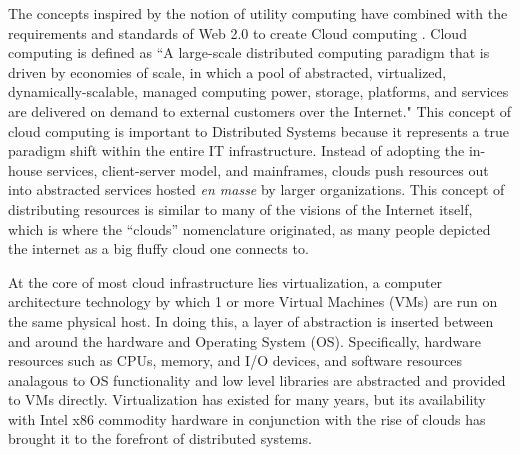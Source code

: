 The concepts inspired by the notion of utility computing have combined with the requirements and standards of Web 2.0 \cite{alexander2006wnw} to create Cloud computing \cite{buyya2008moc, foster2008cca, aboveTheClouds}.  Cloud computing is defined as ``A large-scale distributed computing paradigm that is driven by economies of scale, in which a pool of abstracted, virtualized, dynamically-scalable, managed computing power, storage, platforms, and services are delivered on demand to external customers over the Internet." This concept of cloud computing is important to Distributed Systems because it represents a true paradigm shift \cite{kuhn1970structure} within the entire IT infrastructure.  Instead of adopting the in-house services, client-server model, and mainframes, clouds push resources out into abstracted services hosted \textit{en masse} by larger organizations.  This concept of distributing resources is similar to many of the visions of the Internet itself, which is where the ``clouds'' nomenclature originated, as many people depicted the internet as a big fluffy cloud one connects to.

At the core of most cloud infrastructure lies virtualization, a computer architecture technology by which 1 or more Virtual Machines (VMs) are run on the same physical host. In doing this, a layer of abstraction is inserted between and around the hardware and Operating System (OS). Specifically, hardware resources such as CPUs, memory, and I/O devices, and software resources analagous to OS functionality and low level libraries are abstracted and provided to VMs directly. Virtualization has existed for many years, but its availability with Intel x86 commodity hardware in conjunction with the rise of clouds has brought it to the forefront of distributed systems. 


